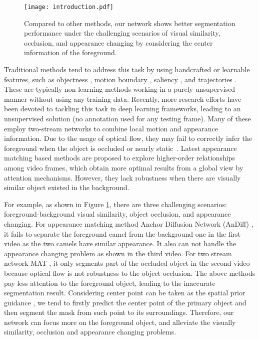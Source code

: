 \documentclass[letterpaper]{article} \usepackage{aaai20}  \usepackage{times}  \usepackage{helvet} \usepackage{courier}  \usepackage[hyphens]{url}  \usepackage{graphicx} \urlstyle{rm} \def\UrlFont{\rm}  \usepackage{graphicx}  \frenchspacing  \setlength{\pdfpagewidth}{8.5in}  \setlength{\pdfpageheight}{11in}  \usepackage{amssymb}
\begin{document}
\begin{figure}[t!]
\centering
\texttt{[image: introduction.pdf]}
\caption{Compared to other methods, our network shows better segmentation performance under the challenging scenarios of visual similarity, occlusion, and appearance changing by considering the center information of the foreground.}
\label{fig:introduction}
\vspace{-12pt}
\end{figure}

Traditional methods tend to address this task by using handcrafted or learnable features, such as objectness \cite{zhang2013video}, motion boundary \cite{papazoglou2013fast}, saliency \cite{wang2015saliency}, and trajectories \cite{ochs2011object}. These are typically non-learning methods working in a purely unsupervised manner without using any training data.
Recently, more research efforts have been devoted to tackling this task in deep learning frameworks,
leading to an unsupervised solution (no annotation used for any testing frame).
Many of these \cite{zhou2020motion,cheng2017segflow,li2018unsupervised} employ two-stream networks to combine local motion and appearance information. Due to the usage of optical flow, they may fail to correctly infer the foreground when the object is occluded or nearly static~\cite{tokmakov2017learning}. Latest appearance matching based methods \cite{wang2019zero,yang2019anchor,lu2019see} are proposed to explore higher-order relationships among video frames, which obtain more optimal results from a global view by attention mechanisms. However, they lack robustness when there are visually similar object existed in the background.


For example, as shown in Figure \ref{fig:introduction}, there are three challenging scenarios: foreground-background visual similarity, object occlusion, and appearance changing. For appearance matching method Anchor Diffusion Network (AnDiff) \cite{yang2019anchor}, it fails to separate the foreground camel from the background one in the first video as the two camels have similar appearance.
It also can not handle the appearance changing problem as shown in the third video. For two stream network MAT \cite{zhou2020motion}, it only segments part of the occluded object in the second video because optical flow is not robustness to the object occlusion.
The above methods pay less attention to the foreground object, leading to the inaccurate segmentation result.
Considering center point can be taken as the spatial prior guidance \cite{zhou2019objects,zhou2020tracking,wang2020centermask}, we tend to firstly predict the center point of the primary object and then segment the mask from such point to its surroundings. Therefore, our network can focus more on the foreground object, and alleviate the visually similarity, occlusion and appearance changing problems.
\end{document}
